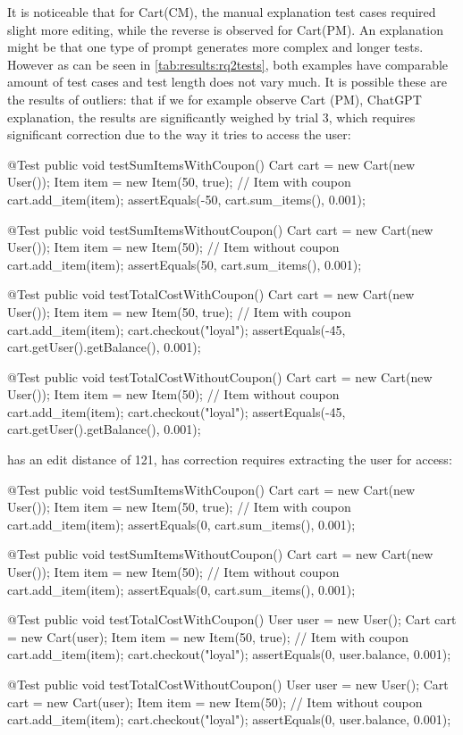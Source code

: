 It is noticeable that for Cart(CM), the manual explanation test cases required slight more editing, while the reverse
is observed for Cart(PM). An explanation might be that one type of prompt generates more complex and longer tests. However as can be seen in
\cref{tab:results:rq2tests}, both examples have comparable amount of test cases and test length does not vary much.
It is possible these are the results of outliers: that if we for example observe Cart (PM), ChatGPT explanation, the results are significantly weighed by
trial 3, which requires significant correction due to the way it tries to access the user:
\begin{response}
@Test
public void testSumItemsWithCoupon() {
    Cart cart = new Cart(new User());
    Item item = new Item(50, true); // Item with coupon
    cart.add_item(item);
    assertEquals(-50, cart.sum_items(), 0.001);
}

@Test
public void testSumItemsWithoutCoupon() {
    Cart cart = new Cart(new User());
    Item item = new Item(50); // Item without coupon
    cart.add_item(item);
    assertEquals(50, cart.sum_items(), 0.001);
}

@Test
public void testTotalCostWithCoupon() {
    Cart cart = new Cart(new User());
    Item item = new Item(50, true); // Item with coupon
    cart.add_item(item);
    cart.checkout("loyal");
    assertEquals(-45, cart.getUser().getBalance(), 0.001);
}

@Test
public void testTotalCostWithoutCoupon() {
    Cart cart = new Cart(new User());
    Item item = new Item(50); // Item without coupon
    cart.add_item(item);
    cart.checkout("loyal");
    assertEquals(-45, cart.getUser().getBalance(), 0.001);
}
\end{response}
has an edit distance of 121, has correction requires extracting the user for access:
\begin{response}
@Test
public void testSumItemsWithCoupon() {
    Cart cart = new Cart(new User());
    Item item = new Item(50, true); // Item with coupon
    cart.add_item(item);
    assertEquals(0, cart.sum_items(), 0.001);
}

@Test
public void testSumItemsWithoutCoupon() {
    Cart cart = new Cart(new User());
    Item item = new Item(50); // Item without coupon
    cart.add_item(item);
    assertEquals(0, cart.sum_items(), 0.001);
}

@Test
public void testTotalCostWithCoupon() {
    User user = new User();
    Cart cart = new Cart(user);
    Item item = new Item(50, true); // Item with coupon
    cart.add_item(item);
    cart.checkout("loyal");
    assertEquals(0, user.balance, 0.001);
}

@Test
public void testTotalCostWithoutCoupon() {
    User user = new User();
    Cart cart = new Cart(user);
    Item item = new Item(50); // Item without coupon
    cart.add_item(item);
    cart.checkout("loyal");
    assertEquals(0, user.balance, 0.001);
}
\end{response}
